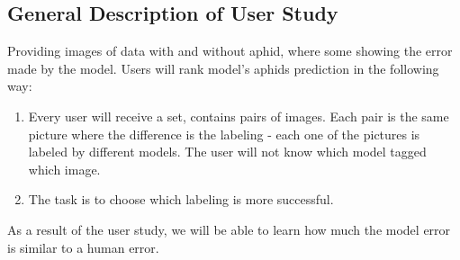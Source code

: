 \documentclass{article}
\begin{document}
\begin{samepage}
  \section*{General Description of User Study}
  Providing images of data with and without aphid, where some showing the error made by the model.
  Users will rank model's aphids prediction in the following way:
  \begin{enumerate}
    \item Every user will receive a set, contains pairs of images. Each pair is the same picture where the difference is the labeling - each one of the pictures is labeled by different models. The user will not know which model tagged which image.
    \item The task is to choose which labeling is more successful.
  \end{enumerate}
  As a result of the user study, we will be able to learn how much the model error is similar to a human error.
\end{samepage}
\end{document}
